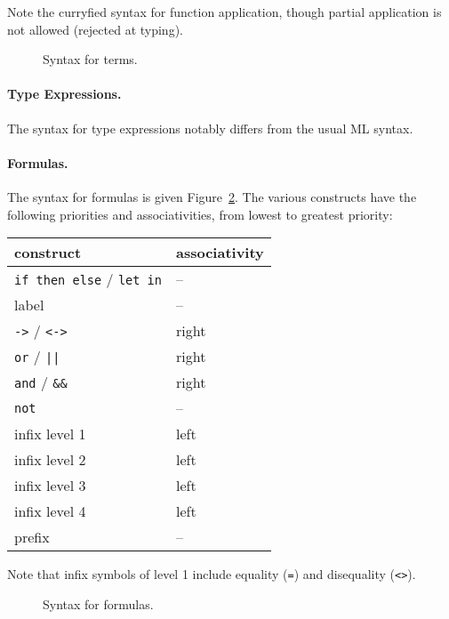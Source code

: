 Note the curryfied syntax for function application, though partial
application is not allowed (rejected at typing).

\begin{figure}
  \begin{center}\framebox{}\end{center}
  \caption{Syntax for terms.}
\label{fig:bnf:term}
\end{figure}

\paragraph{Type Expressions.} The syntax for type
expressions notably differs from the usual ML syntax.
\begin{center}\framebox{}\end{center}

\paragraph{Formulas.}
The syntax for formulas is given Figure~\ref{fig:bnf:formula}.
The various constructs have the following priorities and
associativities, from lowest to greatest priority:
\begin{center}
  \begin{tabular}{|l|l|}
    \hline
    construct & associativity \\
    \hline\hline
    \texttt{if then else} / \texttt{let in} & -- \\
    label & -- \\
    \texttt{->} / \texttt{<->} & right \\
    \texttt{or} / \verb!||! & right \\
    \texttt{and} / \verb!&&! & right \\
    \texttt{not}  & -- \\
    infix level 1 & left \\
    infix level 2 & left \\
    infix level 3 & left \\
    infix level 4 & left \\
    prefix        & --   \\
    \hline
  \end{tabular}
\end{center}
Note that infix symbols of level 1 include equality (\texttt{=}) and
disequality (\texttt{<>}).

\begin{figure}
  \begin{center}\framebox{}\end{center}
  \caption{Syntax for formulas.}
\label{fig:bnf:formula}
\end{figure}

